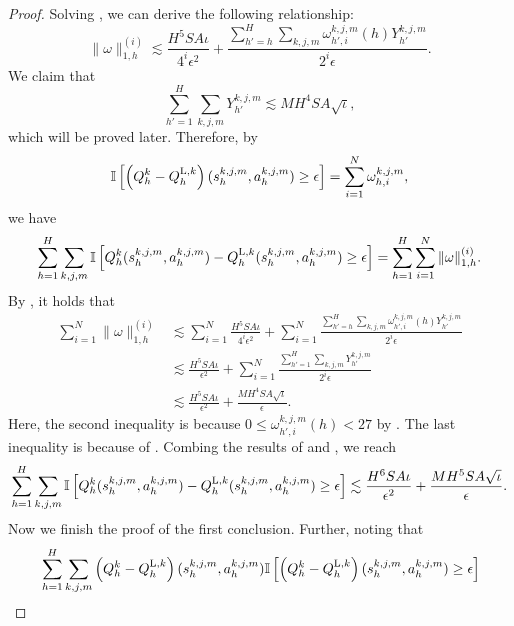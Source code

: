 \documentclass{article}
\newcommand{\LL}{\textnormal{L}}
\begin{document}
\begin{proof}
    Solving , we can derive the following relationship:
    \begin{equation}
    \label{answer}
        \|\omega\|_{1,h}^{(i)} \lesssim \frac{H^5SA\iota}{4^i\epsilon^2} + \frac{\sum_{h' = h}^{H}\sum_{k,j,m} \omega_{h',i}^{k,j,m}(h)Y_{h'}^{k,j,m}}{2^i\epsilon}.
    \end{equation}
    We claim that
\begin{equation}
    \label{upperY}
    \sum_{h' = 1}^{H}\sum_{k,j,m} Y_{h'}^{k,j,m} \lesssim MH^4SA\sqrt{\iota},
\end{equation}
which will be proved later. 
Therefore, by
    $$\mathbb{I} \left [\left(Q_h^k- Q_h^{\LL,k}\right)(s_h^{k,j,m}, a_h^{k,j,m}) \geq \epsilon \right]  = \sum_{i=1}^N\omega_{h,i}^{k,j,m},$$
    we have
    \begin{align}
    \label{clipkmj1}
        \sum_{h=1}^H\sum_{k,j,m} \mathbb{I} \left [Q_h^k(s_h^{k,j,m}, a_h^{k,j,m}) - Q_h^{\LL,k}(s_h^{k,j,m}, a_h^{k,j,m}) \geq \epsilon \right] = \sum_{h=1}^H\sum_{i=1}^N\|\omega\|_{1,h}^{(i)}. 
    \end{align}
    By , it holds that
    \begin{align}
    \label{clipkmj2}
        \sum_{i=1}^N\|\omega\|_{1,h}^{(i)} & \lesssim \sum_{i=1}^N\frac{H^5SA\iota}{4^i\epsilon^2} + \sum_{i=1}^N\frac{\sum_{h' = h}^{H}\sum_{k,j,m} \omega_{h',i}^{k,j,m}(h)Y_{h'}^{k,j,m}}{2^i\epsilon} \nonumber\\
        &\lesssim \frac{H^5 S A \iota}{\epsilon^2}  + \sum_{i=1}^N\frac{\sum_{h' = 1}^{H}\sum_{k,j,m} Y_{h'}^{k,j,m}}{2^i\epsilon} \nonumber\\
        &\lesssim  \frac{H^5 S A \iota}{\epsilon^2}  + \frac{MH^4SA\sqrt{\iota}}{\epsilon}.
    \end{align}
    Here, the second inequality is because $0 \leq \omega_{h',i}^{k,j,m}(h) < 27$ by . The last inequality is because of .
    Combing the results of  and , we reach
    \begin{align*}
        \sum_{h=1}^H \sum_{k,j,m} \mathbb{I} \left [Q_h^k(s_h^{k,j,m}, a_h^{k,j,m}) - Q_h^{\LL,k}(s_h^{k,j,m}, a_h^{k,j,m}) \geq \epsilon \right] 
        \lesssim \frac{H^6 S A \iota}{\epsilon^2}  + \frac{MH^5SA\sqrt{\iota}}{\epsilon}.
    \end{align*}
    Now we finish the proof of the first conclusion. Further, noting that
   \begin{align*} 
  &\sum_{h=1}^H \sum_{k,j,m} \left(Q_h^k - Q_h^{\LL,k}\right)(s_h^{k,j,m}, a_h^{k,j,m}) \mathbb{I}\left[ \left(Q_h^k - Q_h^{\LL,k}\right)(s_h^{k,j,m}, a_h^{k,j,m}) \geq \epsilon \right] \\

\end{align*}
\end{proof}
\end{document}
